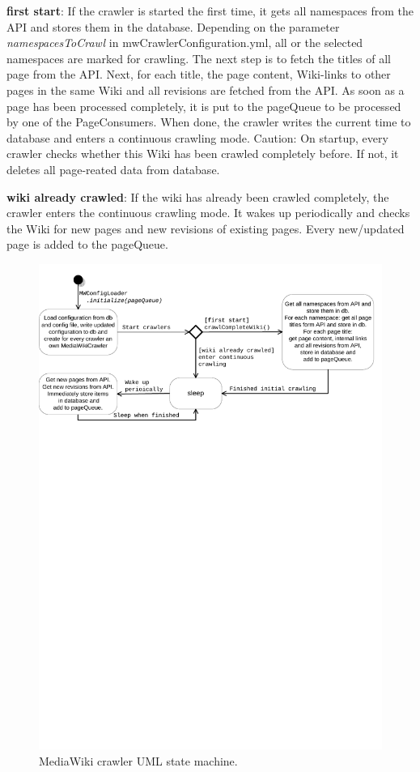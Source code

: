\textbf{first start}: If the crawler is started the first time, it gets all namespaces from the API and stores them in the database. Depending on the parameter \emph{namespacesToCrawl} in mwCrawlerConfiguration.yml, all or the selected namespaces are marked for crawling. The next step is to fetch the titles of all page from the API. Next, for each title, the page content, Wiki-links to other pages in the same Wiki and all revisions are fetched from the API. As soon as a page has been processed completely, it is put to the pageQueue to be processed by one of the PageConsumers. When done, the crawler writes the current time to database and enters a continuous crawling mode. Caution: On startup, every crawler checks whether this Wiki has been crawled completely before. If not, it deletes all page-reated data from database. 

\textbf{wiki already crawled}: If the wiki has already been crawled completely, the crawler enters the continuous crawling mode. It wakes up periodically and checks the Wiki for new pages and new revisions of existing pages. Every new/updated page is added to the pageQueue.

\begin{figure}[htb]
\centering
\includegraphics[width=\textwidth]{img/MediaWikiCrawler-UMLStateMachine.pdf}
\caption{MediaWiki crawler UML state machine.}
\label{fig:MWCrawler-state_machine}
\end{figure}

